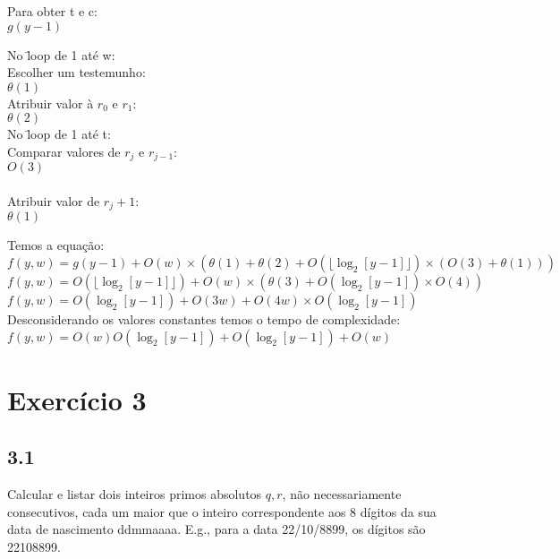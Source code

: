 \documentclass[12pt,letterpaper]{article}
\begin{document}
Para obter t e c: \\
$g(y-1)$ \\

\begin{tabbing}
No \= loop de 1 até w: \\
\> Escolher um testemunho: \\
\> $\theta(1)$ \\ 

\> Atribuir valor à $r_0$ e $r_1$: \\
\> $\theta(2)$ \\

\> No \= loop de 1 até t: \\

\> \> Comparar valores de $r_j$ e $r_{j-1}$: \\
\> \> $O(3)$ \\ \\

\> \> Atribuir valor de $r_j+1$: \\
\> \> $\theta(1)$ \\
\end{tabbing}

Temos a equação: \\
$f(y, w) = g(y-1) + O(w) \times (\theta(1) + \theta(2) + O(\lfloor \log_2 \left[ y-1 \right] \rfloor) \times (O(3) + \theta(1)))$ \\
$f(y, w) = O(\lfloor \log_2 \left[ y-1 \right] \rfloor) + O(w) \times (\theta(3) + O(\log_2 \left[ y-1 \right] ) \times O(4))$ \\
$f(y, w) = O(\log_2 \left[ y-1 \right]) + O(3w) + O(4w) \times O(\log_2 \left[ y-1 \right] )$ \\

Desconsiderando os valores constantes temos o tempo de complexidade: \\
$f(y, w) = O(w)O(\log_2 \left[ y-1 \right] ) + O(\log_2 \left[ y-1 \right]) + O(w)$ \\


\section*{Exercício 3}

\subsection*{3.1}
Calcular e listar dois inteiros primos absolutos $q,r$, não necessariamente consecutivos, cada um maior que o inteiro correspondente aos 8 dígitos da sua data de nascimento ddmmaaaa. E.g., para a data 22/10/8899, os dígitos são 22108899. \\
\end{document}
